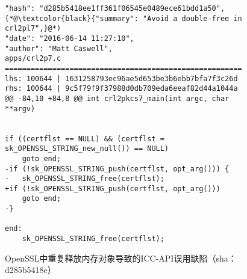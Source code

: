 \begin{figure}[t]
	\centering
\begin{lstlisting}
"hash": "d285b5418ee1ff361f06545e0489ece61bdd1a50",
(*@\textcolor{black}{"summary": "Avoid a double-free in crl2pl7",}@*)
"date": "2016-06-14 11:27:10",
"author": "Matt Caswell",
apps/crl2p7.c
=======================================================
lhs: 100644 | 1631258793ec96ae5d653be3b6ebb7bfa7f3c26d
rhs: 100644 | 9c5f79f9f37988d0db709eda6eeaf82d44a1044a
@@ -84,10 +84,8 @@ int crl2pkcs7_main(int argc, char **argv)


if ((certflst == NULL) && (certflst = sk_OPENSSL_STRING_new_null()) == NULL)
	goto end;
-if (!sk_OPENSSL_STRING_push(certflst, opt_arg())) {
-	sk_OPENSSL_STRING_free(certflst);
+if (!sk_OPENSSL_STRING_push(certflst, opt_arg()))
	goto end;
-}

end:
	sk_OPENSSL_STRING_free(certflst);
\end{lstlisting}
	\caption{
	OpenSSL中重复释放内存对象导致的ICC-API误用缺陷（sha：d285b5418e）
	}
	\label{fig:2-3-icc-3}
\end{figure}